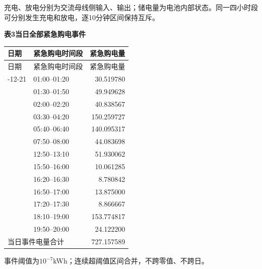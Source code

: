 \noindent 充电、放电分别为交流母线侧输入、输出；储电量为电池内部状态。同一四小时段可分别发生充电和放电，逐10分钟区间保持互斥。
\begin{center}\textbf{表3\quad 当日全部紧急购电事件}\end{center}
\begin{longtable}{llr}\toprule 日期 & 紧急购电时间段 & 紧急购电量\\\midrule\endfirsthead
\toprule 日期 & 紧急购电时间段 & 紧急购电量\\\midrule\endhead
\bottomrule\endfoot
2025-12-21 & 01:00--01:20 & 30.519780\\
 & 01:30--01:50 & 49.949628\\
 & 02:00--02:20 & 40.838567\\
 & 03:30--04:20 & 150.259727\\
 & 05:40--06:40 & 140.095317\\
 & 07:50--08:00 & 44.083698\\
 & 12:50--13:10 & 51.930062\\
 & 15:50--16:00 & 10.061285\\
 & 16:20--16:30 & 8.780842\\
 & 16:50--17:00 & 13.875000\\
 & 17:20--17:30 & 8.866667\\
 & 18:10--19:00 & 153.774817\\
 & 19:50--20:00 & 24.122200\\
\midrule\multicolumn{2}{l}{当日事件电量合计} & 727.157589\\
\end{longtable}
\noindent 事件阈值为$10^{-7}$kWh；连续超阈值区间合并，不跨零值、不跨日。
\endgroup
\clearpage
